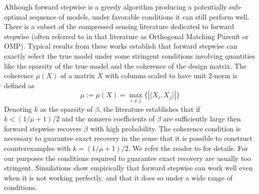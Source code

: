 \documentclass{imsart}
\newcommand{\innerp}[2]{\langle #1 , #2 \rangle}
\begin{document}
Although forward stepwise is a greedy algorithm producing a
potentially sub-optimal sequence of models, under favorable conditions
it can still perform well. There is a subset of the compressed sensing literature \citep{donoho:pursuit, cai:wang:omp} dedicated to forward stepwise (often referred to in that literature as Orthogonal Matching Pursuit or OMP). 
Typical results from these works establish that forward stepwise can exactly select the true model under some stringent conditions involving quantities like the sparsity of the true model and the coherence of the design matrix.
The coherence $\mu(X)$ of a matrix $X$ with columns scaled to have unit 2-norm is defined as
\begin{equation}
  \mu := \mu(X) = \max_{i \neq j} \{ | \innerp{ X_i }{ X_j } | \}
\end{equation}
Denoting $k$ as the sparsity of $\beta$, the literature establishes
that if $k < (1/\mu + 1)/2$ and the nonzero coefficients of $\beta$ are sufficiently large then forward stepwise recovers $\beta$ with high probability.
The coherence condition is necessary to guarantee exact recovery \citep{cai:wang:xu:sharp} in the sense that it is possible to construct counterexamples with $k = (1/\mu + 1)/2$.
We refer the reader to \cite{donoho:pursuit, cai:wang:omp} for details.
For our purposes the conditions required to guarantee exact recovery are usually too stringent.
Simulations show empirically that forward stepwise can work well even when it is not working perfectly, and that it does so under a wide range of conditions.
\end{document}
